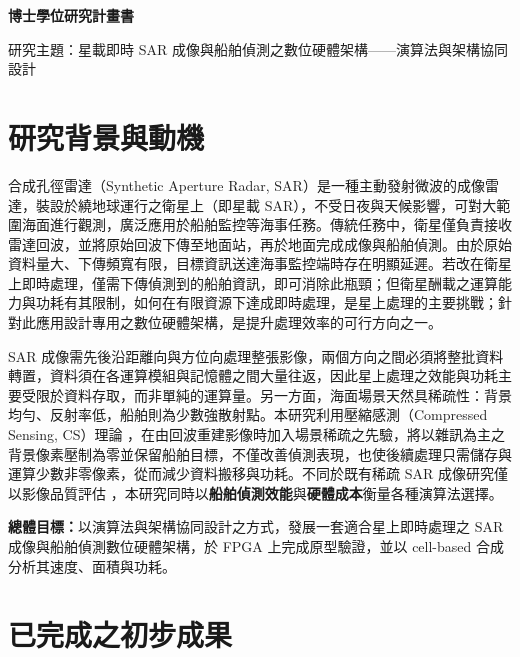 \documentclass[11pt,fontset=none]{ctexart}
\begin{document}
\begin{center}
  {\Large\bfseries 博士學位研究計畫書\par}
  \vspace{2pt}
  {\large 研究主題：星載即時 SAR 成像與船舶偵測之數位硬體架構——演算法與架構協同設計\par}
\end{center}

\section{研究背景與動機}

合成孔徑雷達（Synthetic Aperture Radar, SAR）是一種主動發射微波的成像雷達，裝設於繞地球運行之衛星上（即星載 SAR），不受日夜與天候影響，可對大範圍海面進行觀測，廣泛應用於船舶監控等海事任務。傳統任務中，衛星僅負責接收雷達回波，並將原始回波下傳至地面站，再於地面完成成像與船舶偵測。由於原始資料量大、下傳頻寬有限，目標資訊送達海事監控端時存在明顯延遲。若改在衛星上即時處理，僅需下傳偵測到的船舶資訊，即可消除此瓶頸；但衛星酬載之運算能力與功耗有其限制，如何在有限資源下達成即時處理，是星上處理的主要挑戰；針對此應用設計專用之數位硬體架構，是提升處理效率的可行方向之一。

SAR 成像需先後沿距離向與方位向處理整張影像，兩個方向之間必須將整批資料轉置，資料須在各運算模組與記憶體之間大量往返，因此星上處理之效能與功耗主要受限於資料存取，而非單純的運算量。另一方面，海面場景天然具稀疏性：背景均勻、反射率低，船舶則為少數強散射點。本研究利用壓縮感測（Compressed Sensing, CS）理論 \cite{donoho_cs, candes_cs}，在由回波重建影像時加入場景稀疏之先驗，將以雜訊為主之背景像素壓制為零並保留船舶目標，不僅改善偵測表現，也使後續處理只需儲存與運算少數非零像素，從而減少資料搬移與功耗。不同於既有稀疏 SAR 成像研究僅以影像品質評估 \cite{sparse_sar_imaging, zhang_reweighted, liu_compound_reg}，本研究同時以\textbf{船舶偵測效能}與\textbf{硬體成本}衡量各種演算法選擇。

\textbf{總體目標：}以演算法與架構協同設計之方式，發展一套適合星上即時處理之 SAR 成像與船舶偵測數位硬體架構，於 FPGA 上完成原型驗證，並以 cell-based 合成分析其速度、面積與功耗。

\section{已完成之初步成果}
\end{document}
